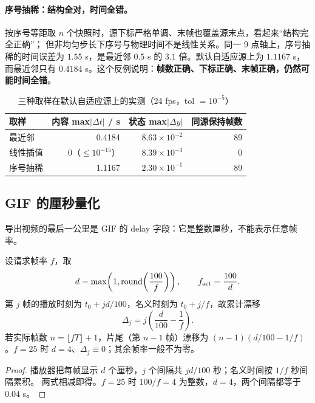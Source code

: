 \paragraph{序号抽稀：结构全对，时间全错。}
按序号等距取 $n$ 个快照时，源下标严格单调、末帧也覆盖源末点，看起来“结构完全正确”；
但非均匀步长下序号与物理时间不是线性关系。同一 9 点轴上，序号抽稀的时间误差为
$1.55$ s，是最近邻 $0.5$ s 的 $3.1$ 倍。默认自适应源上为 $1.1167$ s，而最近邻只有
$0.4184$ s。这个反例说明：\textbf{帧数正确、下标正确、末帧正确，仍然可能时间全错}。

\begin{table}[htbp]
\centering
\caption{三种取样在默认自适应源上的实测（24 fps，tol $=10^{-5}$）}
\begin{tabular}{lrrr}
\toprule
取样 & 内容 max$|\Delta t|$ / s & 状态 max$|\Delta y|$ & 同源保持帧数 \\
\midrule
最近邻 & 0.4184 & $8.63\times10^{-2}$ & 89 \\
线性插值 & $0$（$\le10^{-15}$） & $8.39\times10^{-3}$ & 0 \\
序号抽稀 & 1.1167 & $2.30\times10^{-1}$ & 89 \\
\bottomrule
\end{tabular}
\end{table}

\subsection{GIF 的厘秒量化}

导出视频的最后一公里是 GIF 的 delay 字段：它是整数厘秒，不能表示任意帧率。

\begin{theorem}\label{thm:gif}
设请求帧率 $f$，取
\[
  d=\max\!\left(1,\operatorname{round}\!\left(\frac{100}{f}\right)\right),
  \qquad f_{\rm act}=\frac{100}{d}.
\]
第 $j$ 帧的播放时刻为 $t_0+jd/100$，名义时刻为 $t_0+j/f$，故累计漂移
\[
  \Delta_j=j\left(\frac{d}{100}-\frac1f\right).
\]
若实际帧数 $n=\lfloor fT\rfloor+1$，片尾（第 $n-1$ 帧）漂移为
$(n-1)(d/100-1/f)$。$f=25$ 时 $d=4$、$\Delta_j\equiv0$；其余帧率一般不为零。
\end{theorem}

\begin{proof}
播放器把每帧显示 $d$ 个厘秒，$j$ 个间隔共 $jd/100$ 秒；名义时间按 $1/f$ 秒间隔累积。
两式相减即得。$f=25$ 时 $100/f=4$ 为整数，$d=4$，两个间隔都等于 $0.04$ s。
\end{proof}


